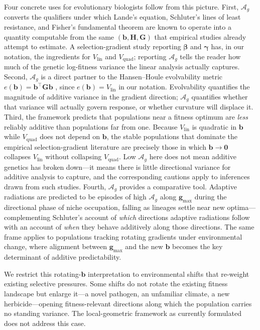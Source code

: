 \documentclass[9pt,twocolumn,twoside,lineno]{gsajnl}
\newcommand{\vect}[1]{\boldsymbol{#1}}
\newcommand{\mat}[1]{\mathbf{#1}}
\newcommand{\Ag}{\ensuremath{\mathcal{A}_{g}}\xspace}
\newcommand{\Vlin}{\ensuremath{V_{\text{lin}}}\xspace}
\newcommand{\Vquad}{\ensuremath{V_{\text{quad}}}\xspace}
\begin{document}
Four concrete uses for evolutionary biologists follow from this picture. First, \Ag converts the qualifiers under which Lande's equation, Schluter's lines of least resistance, and Fisher's fundamental theorem are known to operate into a quantity computable from the same $(\vect{b},\mat{H},\mat{G})$ that empirical studies already attempt to estimate. A selection-gradient study reporting $\bm{\beta}$ and $\bm{\gamma}$ has, in our notation, the ingredients for $\Vlin$ and $\Vquad$; reporting \Ag tells the reader how much of the genetic log-fitness variance the linear analysis actually captures. Second, \Ag is a direct partner to the Hansen--Houle evolvability metric $e(\vect{b}) = \vect{b}^\top \mat{G} \vect{b}$ \citep{HansenHoule2008}, since $e(\vect{b}) = \Vlin$ in our notation. Evolvability quantifies the magnitude of additive variance in the gradient direction; \Ag quantifies whether that variance will actually govern response, or whether curvature will displace it. Third, the framework predicts that populations near a fitness optimum are \emph{less} reliably additive than populations far from one. Because $\Vlin$ is quadratic in $\vect{b}$ while $\Vquad$ does not depend on $\vect{b}$, the stable populations that dominate the empirical selection-gradient literature are precisely those in which $\vect{b}\to\vect{0}$ collapses $\Vlin$ without collapsing $\Vquad$. Low \Ag here does not mean additive genetics has broken down---it means there is little directional variance for additive analysis to capture, and the corresponding cautions apply to inferences drawn from such studies. Fourth, \Ag provides a comparative tool. Adaptive radiations are predicted to be episodes of high \Ag along $\vect{g}_{\max}$ during the directional phase of niche occupation, falling as lineages settle near new optima---complementing Schluter's account of \emph{which} directions adaptive radiations follow \citep{Schluter1996} with an account of \emph{when} they behave additively along those directions. The same frame applies to populations tracking rotating gradients under environmental change, where alignment between $\vect{g}_{\max}$ and the new $\vect{b}$ becomes the key determinant of additive predictability.

We restrict this rotating-$\vect{b}$ interpretation to environmental shifts that re-weight existing selective pressures. Some shifts do not rotate the existing fitness landscape but enlarge it---a novel pathogen, an unfamiliar climate, a new herbicide---opening fitness-relevant directions along which the population carries no standing variance. The local-geometric framework as currently formulated does not address this case.
\end{document}
